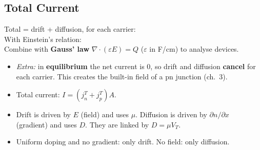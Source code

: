     \subsection[2.9]{Total Current}
    Total = drift + diffusion, for each carrier: 
    \\
    With Einstein's relation: 
    \\
    Combine with \textbf{Gauss' law} $\nabla\cdot(\varepsilon E) = Q$ ($\varepsilon$ in F/cm) to analyse devices. 
    \begin{itemize}
        \item \textit{Extra:} in \textbf{equilibrium} the net current is 0, so drift and diffusion \textbf{cancel} for each carrier. This creates the built-in field of a pn junction (ch.\ 3).
        \item Total current: $I = (j_n^T + j_p^T)A$.
    \end{itemize}

    \begin{handy}
        \begin{itemize}
            \item Drift is driven by $E$ (field) and uses $\mu$. Diffusion is driven by $\partial n/\partial x$ (gradient) and uses $D$. They are linked by $D = \mu V_T$.
            \item Uniform doping and no gradient: only drift. No field: only diffusion.
        \end{itemize}
    \end{handy}

